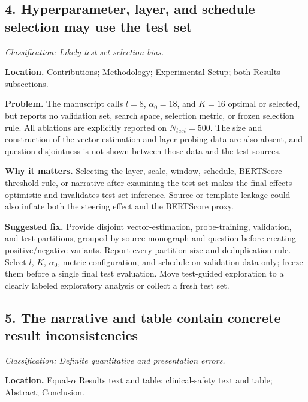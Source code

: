 \documentclass[11pt]{article}
\newcommand{\findinglabel}[1]{\textbf{#1}}
\newcommand{\classification}[1]{\textit{Classification: #1.}}
\begin{document}
\subsection*{4. Hyperparameter, layer, and schedule selection may use the test set}

\classification{Likely test-set selection bias}

\findinglabel{Location.} Contributions; Methodology; Experimental Setup; both Results subsections.

\findinglabel{Problem.} The manuscript calls $l=8$, $\alpha_0=18$, and $K=16$ optimal or selected, but reports no validation set, search space, selection metric, or frozen selection rule.  All ablations are explicitly reported on $N_{test}=500$.  The size and construction of the vector-estimation and layer-probing data are also absent, and question-disjointness is not shown between those data and the test sources.

\findinglabel{Why it matters.} Selecting the layer, scale, window, schedule, BERTScore threshold rule, or narrative after examining the test set makes the final effects optimistic and invalidates test-set inference.  Source or template leakage could also inflate both the steering effect and the BERTScore proxy.

\findinglabel{Suggested fix.} Provide disjoint vector-estimation, probe-training, validation, and test partitions, grouped by source monograph and question before creating positive/negative variants.  Report every partition size and deduplication rule.  Select $l$, $K$, $\alpha_0$, metric configuration, and schedule on validation data only; freeze them before a single final test evaluation.  Move test-guided exploration to a clearly labeled exploratory analysis or collect a fresh test set.

\subsection*{5. The narrative and table contain concrete result inconsistencies}

\classification{Definite quantitative and presentation errors}

\findinglabel{Location.} Equal-$\alpha$ Results text and table; clinical-safety text and table; Abstract; Conclusion.
\end{document}
